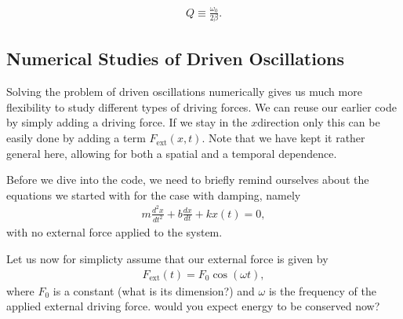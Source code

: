 \documentclass[letterpaper,10pt,english]{sphinxmanual}
\begin{document}
\begin{equation*}
\begin{split}
\begin{equation}
Q\equiv \frac{\omega_0}{2\beta}.
\label{_auto15} \tag{24}
\end{equation}
\end{split}
\end{equation*}

\subsection{Numerical Studies of Driven Oscillations}
\label{\detokenize{chapter4:numerical-studies-of-driven-oscillations}}
Solving the problem of driven oscillations numerically gives us much
more flexibility to study different types of driving forces. We can
reuse our earlier code by simply adding a driving force. If we stay in
the \(x\)\sphinxhyphen{}direction only this can be easily done by adding a term
\(F_{\mathrm{ext}}(x,t)\). Note that we have kept it rather general
here, allowing for both a spatial and a temporal dependence.

Before we dive into the code, we need to briefly remind ourselves
about the equations we started with for the case with damping, namely
\begin{equation*}
\begin{split}
m\frac{d^2x}{dt^2} + b\frac{dx}{dt}+kx(t) =0,
\end{split}
\end{equation*}
with no external force applied to the system.

Let us now for simplicty assume that our external force is given by
\begin{equation*}
\begin{split}
F_{\mathrm{ext}}(t) = F_0\cos{(\omega t)},
\end{split}
\end{equation*}
where \(F_0\) is a constant (what is its dimension?) and \(\omega\) is the frequency of the applied external driving force.
 would you expect energy to be conserved now?
\end{document}
